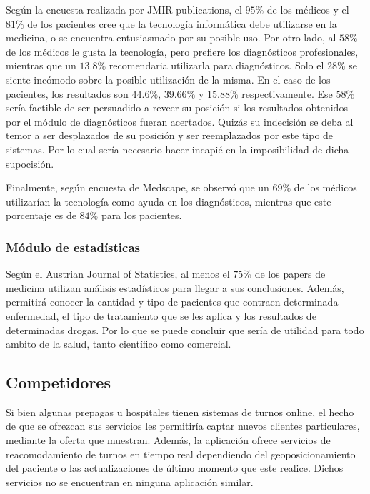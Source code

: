 \documentclass[a4paper,10pt]{article}
\begin{document}
Según la encuesta realizada por JMIR publications, el $95\%$ de los médicos y el  $81\%$ de los pacientes cree que la tecnología informática debe utilizarse en la medicina, o se encuentra entusiasmado por su posible uso. Por otro lado, al $58\%$ de los médicos le gusta la tecnología, pero prefiere los diagnósticos profesionales, mientras que un $13.8\%$ recomendaria utilizarla para diagnósticos. Solo el $28\%$ se siente incómodo sobre la posible utilización de la misma. En el caso de los pacientes, los resultados son $44.6\%$, $39.66\%$ y $15.88\%$ respectivamente. Ese $58\%$ sería factible de ser persuadido a reveer su posición si los resultados obtenidos por el módulo de diagnósticos fueran acertados. Quizás su indecisión se deba al temor a ser desplazados de su posición y ser reemplazados por este tipo de sistemas. Por lo cual sería necesario hacer incapié en la imposibilidad de dicha supocisión.

Finalmente, según encuesta de Medscape, se observó que un $69\%$ de los médicos utilizarían la tecnología como ayuda en los diagnósticos, mientras que este porcentaje es de $84\%$ para los pacientes.

\subsubsection{Módulo de estadísticas}

Según el Austrian Journal of Statistics, al menos el $75\%$ de los 
papers de medicina utilizan análisis estadísticos para llegar a sus conclusiones. Además, permitirá conocer la cantidad y tipo de pacientes que contraen determinada enfermedad, el tipo de tratamiento que se les aplica y los resultados de determinadas drogas. Por lo que se puede concluir que sería de utilidad para todo ambito de la salud, tanto científico como comercial.

\subsection{Competidores}

Si bien algunas prepagas u hospitales tienen sistemas de turnos online, 
el hecho de que se ofrezcan sus servicios les permitiría captar nuevos clientes particulares, 
mediante la oferta que muestran. Además, la aplicación ofrece servicios de reacomodamiento 
de turnos en tiempo real dependiendo del geoposicionamiento del paciente o las 
actualizaciones de último momento que este realice. Dichos servicios no se encuentran en 
ninguna aplicación similar. 
\end{document}
